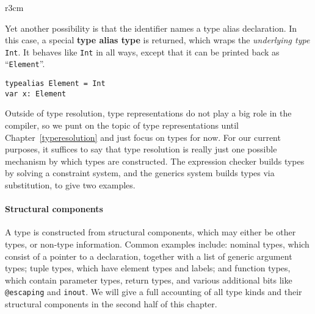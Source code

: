 \documentclass[../generics]{subfiles}
\begin{document}
\medskip

\begin{wrapfigure}[8]{r}{3cm}
\end{wrapfigure}

Yet another possibility is that the identifier names a type alias declaration. In this case, a special \textbf{type alias type} is returned, which wraps the \emph{underlying type} \texttt{Int}. It behaves like \texttt{Int} in all ways, except that it can be printed back as ``\texttt{Element}''.

\medskip
\noindent
\begin{minipage}{29em}
\begin{Verbatim}
typealias Element = Int
var x: Element
\end{Verbatim}
\end{minipage}
\medskip

Outside of type resolution, type representations do not play a big role in the compiler, so we punt on the topic of type representations until Chapter~\ref{typeresolution} and just focus on types for now. For our current purposes, it suffices to say that type resolution is really just one possible mechanism by which types are constructed. The expression checker builds types by solving a constraint system, and the generics system builds types via substitution, to give two examples.

\paragraph{Structural components} A type is constructed from structural components, which may either be other types, or non-type information. Common examples include: nominal types, which consist of a pointer to a declaration, together with a list of generic argument types; tuple types, which have element types and labels; and function types, which contain parameter types, return types, and various additional bits like \texttt{@escaping} and \texttt{inout}.  We will give a full accounting of all type kinds and their structural components in the second half of this chapter.
\end{document}
